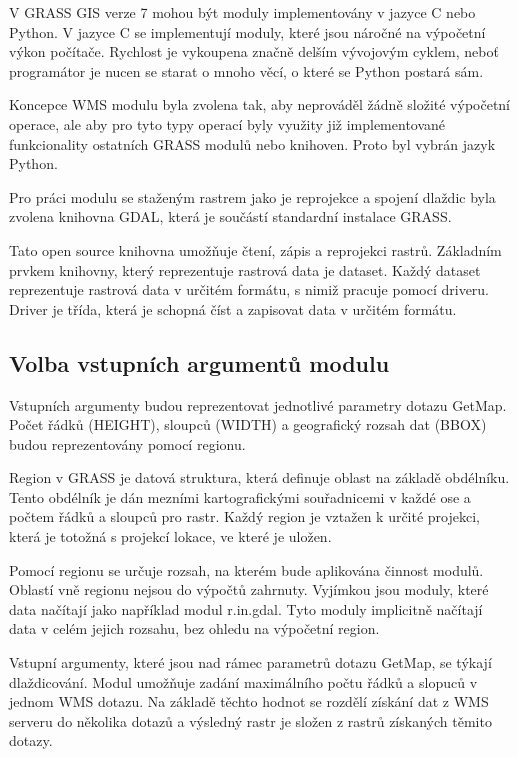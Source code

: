 \documentclass[a4paper,12pt]{article}
\begin{document}
V GRASS GIS verze 7 mohou být moduly implementovány v jazyce C nebo Python. V jazyce C se implementují moduly, které jsou náročné na výpočetní výkon počítače. 
Rychlost je vykoupena značně delším vývojovým cyklem, neboť programátor je nucen se starat o mnoho věcí, o které se Python postará sám.

Koncepce WMS modulu byla zvolena tak, aby neprováděl žádně složité výpočetní operace, ale aby pro tyto typy operací byly využity již implementované funkcionality 
ostatních GRASS modulů nebo knihoven. Proto byl vybrán jazyk Python. 

Pro práci modulu se staženým rastrem jako je reprojekce a spojení dlaždic byla zvolena knihovna GDAL, která je součástí standardní instalace GRASS.

Tato open source knihovna umožňuje čtení, zápis a reprojekci rastrů.  
Základním prvkem knihovny, který reprezentuje rastrová data je dataset.  Každý dataset reprezentuje rastrová data v určitém formátu, s nimiž pracuje pomocí driveru. Driver je třída, která je schopná číst a zapisovat data v určitém formátu. 

\subsection{Volba vstupních argumentů modulu}


 Vstupních argumenty budou reprezentovat jednotlivé parametry dotazu GetMap. Počet řádků (HEIGHT), sloupců (WIDTH) a geografický rozsah dat (BBOX) 
budou reprezentovány pomocí regionu. 

Region v GRASS je datová struktura, která definuje oblast na základě obdélníku. Tento obdélník je dán mezními kartografickými  souřadnicemi v každé ose a počtem řádků a sloupců pro rastr. Každý region je vztažen k určité projekci, která je totožná s projekcí lokace, ve které je uložen.

Pomocí regionu se určuje rozsah, na kterém bude aplikována činnost modulů.
Oblastí vně regionu nejsou do výpočtů zahrnuty. Vyjímkou jsou moduly, které data načítají jako například modul r.in.gdal. Tyto moduly implicitně načítají data v celém jejich rozsahu, bez ohledu na výpočetní region. 

Vstupní argumenty, které jsou nad rámec parametrů dotazu GetMap, se týkají dlaždicování. Modul umožňuje zadání maximálního počtu řádků 
a slopuců v jednom WMS dotazu. Na základě těchto hodnot se rozdělí získání dat z WMS serveru do několika dotazů a výsledný rastr je složen z rastrů získaných těmito dotazy. 
   
\end{document}

